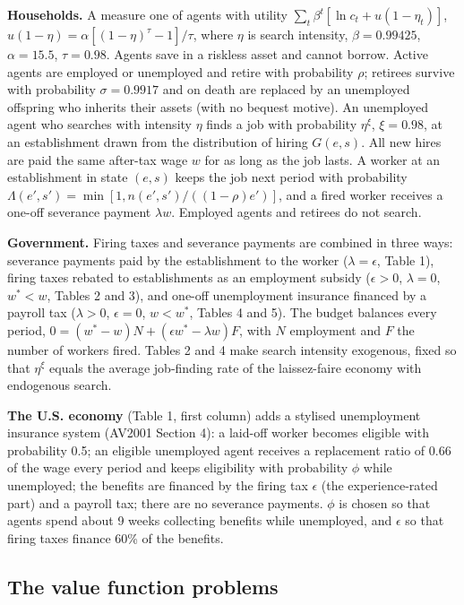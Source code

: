 \documentclass[11pt,fleqn]{article}
\begin{document}
\textbf{Households.} A measure one of agents with utility $\sum_t\beta^t[\ln c_t + u(1-\eta_t)]$, $u(1-\eta)=\alpha[(1-\eta)^\tau-1]/\tau$, where $\eta$ is search intensity, $\beta=0.99425$, $\alpha=15.5$, $\tau=0.98$. Agents save in a riskless asset and cannot borrow. Active agents are employed or unemployed and retire with probability $\rho$; retirees survive with probability $\sigma=0.9917$ and on death are replaced by an unemployed offspring who inherits their assets (with no bequest motive). An unemployed agent who searches with intensity $\eta$ finds a job with probability $\eta^\xi$, $\xi=0.98$, at an establishment drawn from the distribution of hiring $G(e,s)$. All new hires are paid the same after-tax wage $w$ for as long as the job lasts. A worker at an establishment in state $(e,s)$ keeps the job next period with probability $\Lambda(e',s')=\min[1,n(e',s')/((1-\rho)e')]$, and a fired worker receives a one-off severance payment $\lambda w$. Employed agents and retirees do not search.

\textbf{Government.} Firing taxes and severance payments are combined in three ways: severance payments paid by the establishment to the worker ($\lambda=\epsilon$, Table 1), firing taxes rebated to establishments as an employment subsidy ($\epsilon>0$, $\lambda=0$, $w^*<w$, Tables 2 and 3), and one-off unemployment insurance financed by a payroll tax ($\lambda>0$, $\epsilon=0$, $w<w^*$, Tables 4 and 5). The budget balances every period, $0=(w^*-w)N+(\epsilon w^*-\lambda w)F$, with $N$ employment and $F$ the number of workers fired. Tables 2 and 4 make search intensity exogenous, fixed so that $\eta^\xi$ equals the average job-finding rate of the laissez-faire economy with endogenous search.

\textbf{The U.S. economy} (Table 1, first column) adds a stylised unemployment insurance system (AV2001 Section 4): a laid-off worker becomes eligible with probability 0.5; an eligible unemployed agent receives a replacement ratio of 0.66 of the wage every period and keeps eligibility with probability $\phi$ while unemployed; the benefits are financed by the firing tax $\epsilon$ (the experience-rated part) and a payroll tax; there are no severance payments. $\phi$ is chosen so that agents spend about 9 weeks collecting benefits while unemployed, and $\epsilon$ so that firing taxes finance 60\% of the benefits.


\subsection{The value function problems}
\end{document}
